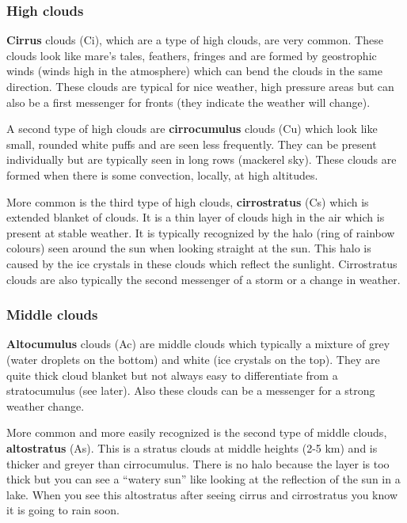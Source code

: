\documentclass[oneside]{book}
\begin{document}
\subsubsection{High clouds}\label{high-clouds}

\textbf{Cirrus} clouds (Ci), which are a type of high clouds, are very
common. These clouds look like mare's tales, feathers, fringes and are
formed by geostrophic winds (winds high in the atmosphere) which can
bend the clouds in the same direction. These clouds are typical for nice
weather, high pressure areas but can also be a first messenger for
fronts (they indicate the weather will change).

A second type of high clouds are \textbf{cirrocumulus} clouds (Cu) which
look like small, rounded white puffs and are seen less frequently. They
can be present individually but are typically seen in long rows
(mackerel sky). These clouds are formed when there is some convection,
locally, at high altitudes.

More common is the third type of high clouds, \textbf{cirrostratus} (Cs)
which is extended blanket of clouds. It is a thin layer of clouds high
in the air which is present at stable weather. It is typically
recognized by the halo (ring of rainbow colours) seen around the sun
when looking straight at the sun. This halo is caused by the ice
crystals in these clouds which reflect the sunlight. Cirrostratus clouds
are also typically the second messenger of a storm or a change in
weather.

\subsubsection{Middle clouds}\label{middle-clouds}

\textbf{Altocumulus} clouds (Ac) are middle clouds which typically a
mixture of grey (water droplets on the bottom) and white (ice crystals
on the top). They are quite thick cloud blanket but not always easy to
differentiate from a stratocumulus (see later). Also these clouds can be
a messenger for a strong weather change.

More common and more easily recognized is the second type of middle
clouds, \textbf{altostratus} (As). This is a stratus clouds at middle
heights (2-5 km) and is thicker and greyer than cirrocumulus. There is
no halo because the layer is too thick but you can see a ``watery sun''
like looking at the reflection of the sun in a lake. When you see this
altostratus after seeing cirrus and cirrostratus you know it is going to
rain soon.
\end{document}
